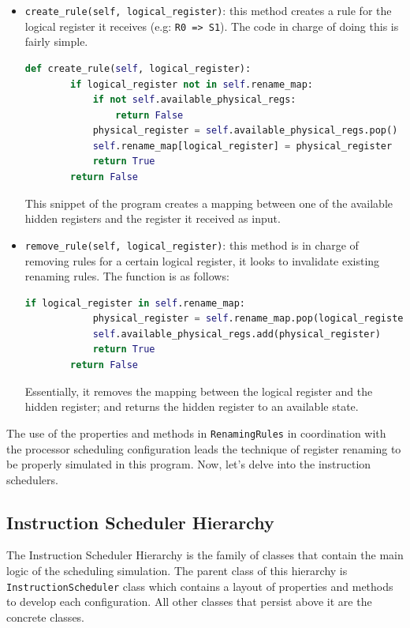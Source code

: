 \documentclass{article}
\begin{document}
\begin{itemize}
    \item \lstinline|create_rule(self, logical_register)|: this method creates a rule for the logical register it receives (e.g: \lstinline|R0 => S1|). The code in charge of doing this is fairly simple. 
\begin{lstlisting}[language=Python]
    def create_rule(self, logical_register):
        if logical_register not in self.rename_map:
            if not self.available_physical_regs:
                return False 
            physical_register = self.available_physical_regs.pop() 
            self.rename_map[logical_register] = physical_register
            return True
        return False
\end{lstlisting}
    This snippet of the program creates a mapping between one of the available hidden registers and the register it received as input. 
    \item \lstinline|remove_rule(self, logical_register)|: this method is in charge of removing rules for a certain logical register, it looks to invalidate existing renaming rules. The function is as follows:
\begin{lstlisting}[language=Python]
        if logical_register in self.rename_map:
            physical_register = self.rename_map.pop(logical_register)
            self.available_physical_regs.add(physical_register) 
            return True
        return False
\end{lstlisting}
    Essentially, it removes the mapping between the logical register and the hidden register; and returns the hidden register to an available state. 
\end{itemize}

The use of the properties and methods in \lstinline|RenamingRules| in coordination with the processor scheduling configuration leads the technique of register renaming to be properly simulated in this program. Now, let's delve into the instruction schedulers.

\subsection{Instruction Scheduler Hierarchy}
The Instruction Scheduler Hierarchy is the family of classes that contain the main logic of the scheduling simulation. The parent class of this hierarchy is \lstinline|InstructionScheduler| class which contains a layout of properties and methods to develop each configuration. All other classes that persist above it are the concrete classes.
\end{document}
